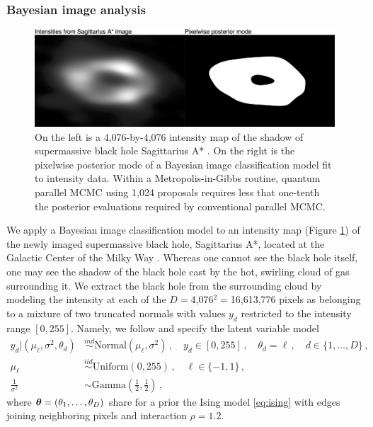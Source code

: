 \documentclass[12pt]{article} %
\begin{document}
\subsubsection{Bayesian image analysis}\label{sec:bayesIm}

 \begin{figure}[!t]
	\centering
	\includegraphics[width=0.9\linewidth]{blackHole.png}
	\caption{On the left is a 4,076-by-4,076 intensity map of the shadow of supermassive black hole Sagittarius A*  \citep{akiyama2022first}.  On the right is the pixelwise posterior mode of a Bayesian image classification model fit to intensity data.  Within a Metropolis-in-Gibbs routine, quantum parallel MCMC using 1,024 proposals requires less that one-tenth the posterior evaluations required by conventional parallel MCMC.}\label{fig:blackHole}
\end{figure}

We apply a Bayesian image classification model to an intensity map (Figure \ref{fig:blackHole}) of the newly imaged supermassive black hole, Sagittarius A*, located at the Galactic Center of the Milky Way \citep{akiyama2022first}.  Whereas one cannot see the black hole itself, one may see the shadow of the black hole cast by the hot, swirling cloud of gas surrounding it.  We extract the black hole from the surrounding cloud by modeling the intensity at each of the $D=$4,076$^2=$16,613,776 pixels as belonging to a mixture of two truncated normals with values $y_{d}$ restricted to the intensity range $[0,255]$.  Namely, we follow \citet{hurn1997difficulties} and specify the latent variable model
\begin{align*}
	y_d |(\mu_\ell, \sigma^2, \theta_d) &\stackrel{ind}{\sim} \mbox{Normal}(\mu_\ell,\sigma^2 ) \, ,\quad y_d \in [0,255] \, , \quad \theta_d=\ell \,,\quad d\in \{1,\dots,D\}\, ,\\
	\mu_\ell &\stackrel{iid}{\sim} \mbox{Uniform} (0,255) \,  , \quad \ell \in \{-1,1\} \, , \\
	\frac{1}{\sigma^2} &\sim  \mbox{Gamma}\left(\frac{1}{2}, \frac{1}{2} \right)  \, ,
\end{align*}
where $\boldsymbol{\theta}=(\theta_1,\dots,\theta_D)$ share for a prior the Ising model \eqref{eq:ising} with edges joining neighboring pixels and interaction $\rho=1.2$. 
\end{document}
